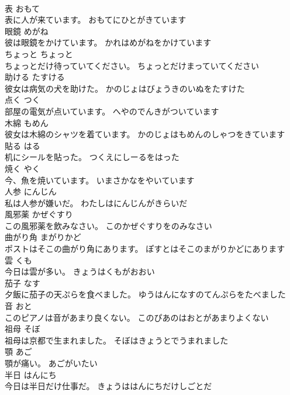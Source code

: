 \documentclass[8pt]{extreport}
\begin{document}
\begin{CJK}{UTF8}{min}
\\	表	おもて	
\\	表に人が来ています。	おもてにひとがきています	
\\	眼鏡	めがね	
\\	彼は眼鏡をかけています。	かれはめがねをかけています	
\\	ちょっと	ちょっと	
\\	ちょっとだけ待っていてください。	ちょっとだけまっていてください	
\\	助ける	たすける	
\\	彼女は病気の犬を助けた。	かのじょはびょうきのいぬをたすけた	
\\	点く	つく	
\\	部屋の電気が点いています。	へやのでんきがついています	
\\	木綿	もめん	
\\	彼女は木綿のシャツを着ています。	かのじょはもめんのしゃつをきています	
\\	貼る	はる	
\\	机にシールを貼った。	つくえにしーるをはった	
\\	焼く	やく	
\\	今、魚を焼いています。	いまさかなをやいています	
\\	人参	にんじん	
\\	私は人参が嫌いだ。	わたしはにんじんがきらいだ	
\\	風邪薬	かぜぐすり	
\\	この風邪薬を飲みなさい。	このかぜぐすりをのみなさい	
\\	曲がり角	まがりかど	
\\	ポストはそこの曲がり角にあります。	ぽすとはそこのまがりかどにあります	
\\	雲	くも	
\\	今日は雲が多い。	きょうはくもがおおい	
\\	茄子	なす	
\\	夕飯に茄子の天ぷらを食べました。	ゆうはんになすのてんぷらをたべました	
\\	音	おと	
\\	このピアノは音があまり良くない。	このぴあのはおとがあまりよくない	
\\	祖母	そぼ	
\\	祖母は京都で生まれました。	そぼはきょうとでうまれました	
\\	顎	あご	
\\	顎が痛い。	あごがいたい	
\\	半日	はんにち	
\\	今日は半日だけ仕事だ。	きょうははんにちだけしごとだ	

\end{CJK}
\end{document}
